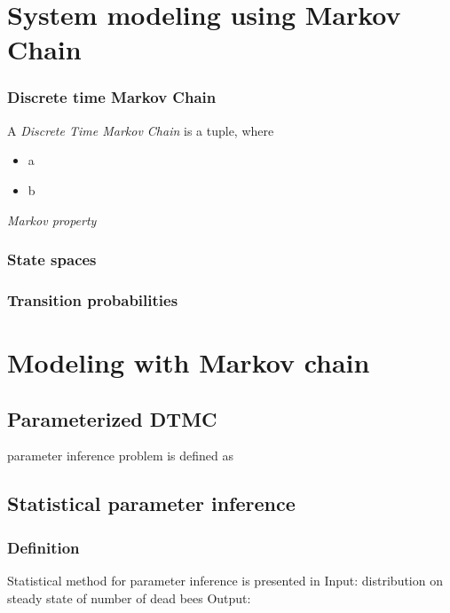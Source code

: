 \documentclass[12pt]{article}
\begin{document}
\section{System modeling using Markov Chain}


\subsubsection{Discrete time Markov Chain}
A \textit{Discrete Time Markov Chain} is a tuple, where
\begin{itemize}
\item a
\item b
  
\end{itemize}

\textit{Markov property}


\subsubsection{State spaces}

\subsubsection{Transition probabilities}

\subsubsection{}


\section{Modeling with Markov chain}
\subsection{Parameterized DTMC}


parameter inference problem is defined as \cite{katoen2016probabilistic}

\subsection{Statistical parameter inference}
\subsubsection{Definition}
Statistical method for parameter inference is presented in \cite{hajnal2019data}
Input: distribution on steady state of number of dead bees Output:
\end{document}
